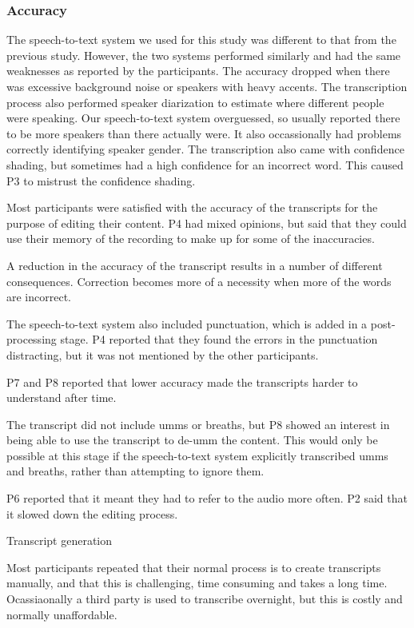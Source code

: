 \subsubsection{Accuracy}

The speech-to-text system we used for this study was different to that from the previous study. However, the two
systems performed similarly and had the same weaknesses as reported by the participants. The accuracy dropped when
there was excessive background noise or speakers with heavy accents. The transcription process also performed speaker
diarization to estimate where different people were speaking. Our speech-to-text system overguessed, so usually
reported there to be more speakers than there actually were. It also occassionally had problems correctly identifying
speaker gender. The transcription also came with confidence shading, but sometimes had a high confidence for an
incorrect word. This caused P3 to mistrust the confidence shading.

Most participants were satisfied with the accuracy of the transcripts for the purpose of editing their content. P4 had
mixed opinions, but said that they could use their memory of the recording to make up for some of the inaccuracies.

A reduction in the accuracy of the transcript results in a number of different consequences. Correction becomes more of
a necessity when more of the words are incorrect.

The speech-to-text system also included punctuation, which is added in a post-processing stage. P4 reported that they
found the errors in the punctuation distracting, but it was not mentioned by the other participants.

P7 and P8 reported that lower accuracy made the transcripts harder to understand after time.

The transcript did not include umms or breaths, but P8 showed an interest in being able to use the transcript to de-umm
the content. This would only be possible at this stage if the speech-to-text system explicitly transcribed umms and
breaths, rather than attempting to ignore them.

P6 reported that it meant they had to refer to the audio more often. P2 said that it slowed down the editing process.

Transcript generation

Most participants repeated that their normal process is to create transcripts manually, and that this is challenging,
time consuming and takes a long time. Ocassiaonally a third party is used to transcribe overnight, but this is costly
and normally unaffordable.

